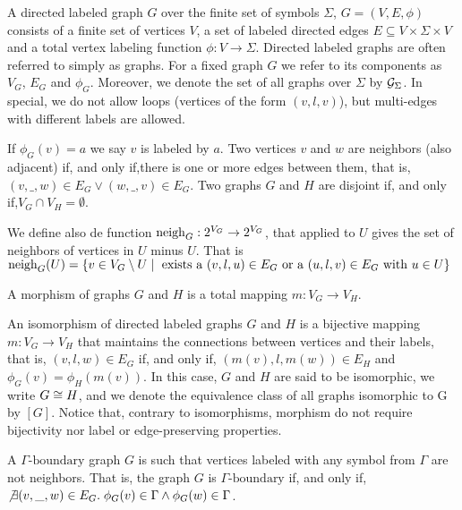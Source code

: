 \documentclass[]{report}
\begin{document}
\begin{definition}
	\label{def:graph}
	A directed labeled graph $G$ over the finite set of symbols $\Sigma$, $G = (V, E, \phi)$ consists of a finite set of vertices $V$, a set of labeled directed edges $E \subseteq V \times \Sigma \times V$ and a total vertex labeling function $\phi : V \to \Sigma$. Directed labeled graphs are often referred to simply as graphs. For a fixed graph $G$ we refer to its components as $V_G$, $E_G$ and $\phi_G$. Moreover, we denote the set of all graphs over $\Sigma$ by $\allgraphs{\Sigma}$. In special, we do not allow loops (vertices of the form $(v,l,v)$), but multi-edges with different labels are allowed.
	
	If $\phi_G(v) = a$ we say $v$ is labeled by $a$. Two vertices $v$ and $w$ are neighbors (also adjacent) if, and only if,there is one or more edges between them, that is, $(v,\_,w) \in E_G \lor (w,\_,v) \in E_G$. Two graphs $G$ and $H$ are disjoint if, and only if,$V_G \cap V_H = \emptyset$.
	
	We define also de function $\neigh{G}: 2^{V_G} \to 2^{V_G}$, that applied to $U$ gives the set of neighbors of vertices in $U$ minus $U$. That is $\neigh{G}(U) = \{ v \in V_G \setminus U \st \text{ exists a } (v,l,u) \in E_G \text{ or a } (u,l,v) \in E_G \text{ with } u \in U \}$
\end{definition}

\begin{definition}
	\label{def:morphism}
	A morphism of graphs $G$ and $H$ is a total mapping $m: V_G \to V_H$.
\end{definition}

\begin{definition}
	An isomorphism of directed labeled graphs $G$ and $H$ is a bijective mapping $m: V_G \to V_H$ that maintains the connections between vertices and their labels, that is, $(v,l,w) \in E_G$ if, and only if,  $(m(v),l,m(w)) \in E_H$ and $\phi_G(v) = \phi_H(m(v))$. In this case, $G$ and $H$ are said to be isomorphic, we write $G \isomorph H$, and we denote the equivalence class of all graphs isomorphic to G by $[G]$.
	Notice that, contrary to isomorphisms, morphism do not require bijectivity nor label or edge-preserving properties.
\end{definition}

\begin{definition}
	A $\Gamma\text{-boundary}$ graph $G$ is such that vertices labeled with any symbol from $\Gamma$ are not neighbors. That is, the graph $G$ is $\Gamma\text{-boundary}$ if, and only if, $\not\exists (v,\_,w) \in E_G \. \phi_G(v) \in \Gamma \land \phi_G(w) \in \Gamma$.
\end{definition}
\end{document}
